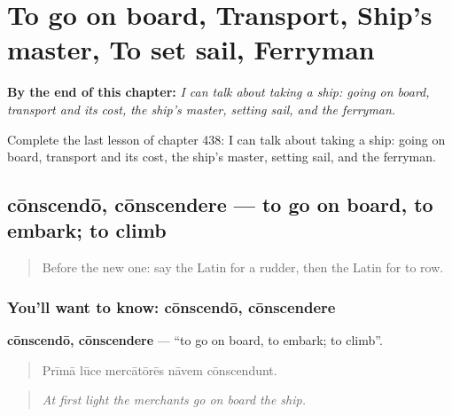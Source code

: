 
\chapter{To go on board, Transport, Ship's master, To set sail, Ferryman}
\label{ch:la-to-go-on-board-transport-ship-s-master-to-set-sail-ferryman}

\begin{chapteropening}
\textbf{By the end of this chapter:} \emph{I can talk about taking a ship: going on board, transport and its cost, the ship's master, setting sail, and the ferryman.}

Complete the last lesson of chapter 438: I can talk about taking a ship: going on board, transport and its cost, the ship's master, setting sail, and the ferryman.
\end{chapteropening}

\section[cōnscendō, cōnscendere]{cōnscendō, cōnscendere — to go on board, to embark; to climb}

\label{lesson:LA-C438-conscendo}



\begin{quote}
Before the new one: say the Latin for a rudder, then the Latin for to row.
\end{quote}

\subsection*{You'll want to know: cōnscendō, cōnscendere}
\textbf{cōnscendō, cōnscendere} — \textquotedblleft{}to go on board, to embark; to climb\textquotedblright{}.

\begin{quote}
Prīmā lūce mercātōrēs nāvem cōnscendunt.
\end{quote}

\begin{quote}
\emph{At first light the merchants go on board the ship.}
\end{quote}

